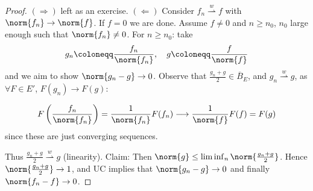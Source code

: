 \documentclass[twoside]{article}
\newcommand{\weakconv}{\overset{w}{\rightharpoonup}}
\begin{document}
\begin{proof}
    $(\Rightarrow)$ left as an exercise.
    $(\Leftarrow)$ Consider $f_n \weakconv f$ with $\norm{f_n} \to \norm{f}$. If $f = 0$ we are done. Assume $f \neq 0$ and $ n \geq n_0$, $n_0$ large enough such that $\norm{f_n} \neq 0$.
    For $n \geq n_0$: take
    \begin{equation*}
        g_n \coloneqq \frac{f_n}{\norm{f_n}}, \quad g \coloneqq \frac{f}{\norm{f}}
    \end{equation*}
    and we aim to show $\norm{g_n - g} \to 0$.
    Observe that $\frac{g_n + g}{2} \in \overline{B}_E$, and $g_n \weakconv g$, as $\forall F \in E'$, $F(g_n) \to F(g)$:

    \begin{equation*}
        F\left(\frac{f_n}{\norm{f_n}}\right) = \frac{1}{\norm{f_n}} F(f_n) \longrightarrow \frac{1}{\norm{f}} F(f) = F(g)
    \end{equation*}
    since these are just converging sequences.

    Thus $\frac{g_n + g}{2} \weakconv g$ (linearity).
    Claim: Then $\norm{g} \leq \liminf_{n} \norm{\frac{g_n + g}{2}}$.
    Hence $\norm{\frac{g_n+g}{2}} \to 1$, and UC implies that $\norm{g_n - g} \to 0$ and finally $\norm{f_n - f} \to 0$.
\end{proof}

\clearpage
\end{document}
